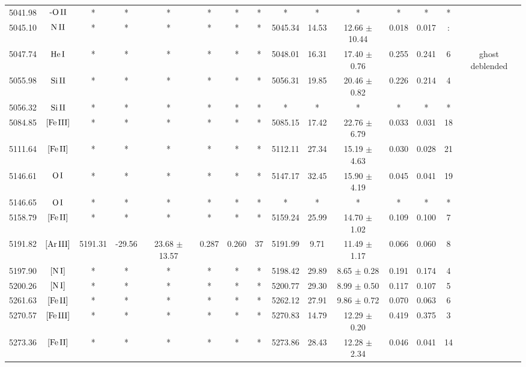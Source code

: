 \documentclass{article}
\begin{document}
\begin{table*}
\begin{adjustbox}{width=\textwidth}
\begin{tabular}{ccccccccccccccc}
5041.98 & $\mbox{-O}\thinspace \mbox{II}$ & * & * & * & * & * & * & * & * & * & * & * & * &  \\
5045.10 & $\mbox{N}\thinspace \mbox{II}$ & * & * & * & * & * & * & 5045.34 & 14.53 & 12.66 $\pm$ 10.44 & 0.018 & 0.017 & : &  \\
5047.74 & $\mbox{He}\thinspace \mbox{I}$ & * & * & * & * & * & * & 5048.01 & 16.31 & 17.40 $\pm$ 0.76 & 0.255 & 0.241 & 6 &  ghost deblended \\
5055.98 & $\mbox{Si}\thinspace \mbox{II}$ & * & * & * & * & * & * & 5056.31 & 19.85 & 20.46 $\pm$ 0.82 & 0.226 & 0.214 & 4 &  \\
5056.32 & $\mbox{Si}\thinspace \mbox{II}$ & * & * & * & * & * & * & * & * & * & * & * & * &  \\
5084.85 & $\mbox{[Fe}\thinspace \mbox{III]}$ & * & * & * & * & * & * & 5085.15 & 17.42 & 22.76 $\pm$ 6.79 & 0.033 & 0.031 & 18 &  \\
5111.64 & $\mbox{[Fe}\thinspace \mbox{II]}$ & * & * & * & * & * & * & 5112.11 & 27.34 & 15.19 $\pm$ 4.63 & 0.030 & 0.028 & 21 &  \\
5146.61 & $\mbox{O}\thinspace \mbox{I}$ & * & * & * & * & * & * & 5147.17 & 32.45 & 15.90 $\pm$ 4.19 & 0.045 & 0.041 & 19 &  \\
5146.65 & $\mbox{O}\thinspace \mbox{I}$ & * & * & * & * & * & * & * & * & * & * & * & * &  \\
5158.79 & $\mbox{[Fe}\thinspace \mbox{II]}$ & * & * & * & * & * & * & 5159.24 & 25.99 & 14.70 $\pm$ 1.02 & 0.109 & 0.100 & 7 &  \\
5191.82 & $\mbox{[Ar}\thinspace \mbox{III]}$ & 5191.31 & -29.56 & 23.68 $\pm$ 13.57 & 0.287 & 0.260 & 37 & 5191.99 & 9.71 & 11.49 $\pm$ 1.17 & 0.066 & 0.060 & 8 &  \\
5197.90 & $\mbox{[N}\thinspace \mbox{I]}$ & * & * & * & * & * & * & 5198.42 & 29.89 & 8.65 $\pm$ 0.28 & 0.191 & 0.174 & 4 &  \\
5200.26 & $\mbox{[N}\thinspace \mbox{I]}$ & * & * & * & * & * & * & 5200.77 & 29.30 & 8.99 $\pm$ 0.50 & 0.117 & 0.107 & 5 &  \\
5261.63 & $\mbox{[Fe}\thinspace \mbox{II]}$ & * & * & * & * & * & * & 5262.12 & 27.91 & 9.86 $\pm$ 0.72 & 0.070 & 0.063 & 6 &  \\
5270.57 & $\mbox{[Fe}\thinspace \mbox{III]}$ & * & * & * & * & * & * & 5270.83 & 14.79 & 12.29 $\pm$ 0.20 & 0.419 & 0.375 & 3 &  \\
5273.36 & $\mbox{[Fe}\thinspace \mbox{II]}$ & * & * & * & * & * & * & 5273.86 & 28.43 & 12.28 $\pm$ 2.34 & 0.046 & 0.041 & 14 &  \\

\end{tabular}
\end{adjustbox}
\end{table*}
\end{document}
